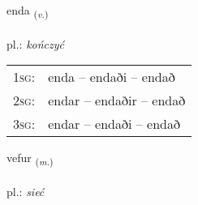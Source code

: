 \documentclass[frontgrid, backgrid]{flacards}\usepackage[]{graphicx}\usepackage[]{xcolor}
\begin{document}
\renewcommand{\flhead}{\vskip5pt \fboxsep=0pt {\small\bfseries\footnotesize Sagnorð | Verb}}
\renewcommand{\fcfoot}{\vskip5pt \fboxsep=0pt \hspace{2pt}{\small\bfseries\footnotesize 1K}}

\renewcommand{\blhead}{\vskip5pt {\small\bfseries\footnotesize Sagnorð | Verb }}
\renewcommand{\bcfoot}{\vskip5pt \hspace{2pt}{\small\bfseries\footnotesize 1K}}


{enda \small{\textsubscript{(\textit{v.})}} \\[1ex] %
\textphonetic{[ɛnta]} \\
pl.: \emph{kończyć} \\  [2ex]
\renewcommand*{\arraystretch}{0.8}
\begin{tabular}{p{1cm}l}
\textsc{1sg}: & enda -- endaði -- endað \\ 
\textsc{2sg}: & endar -- endaðir -- endað \\ 
\textsc{3sg}: & endar -- endaði -- endað \\ 
\end{tabular}
}

\renewcommand{\flhead}{\vskip5pt \fboxsep=0pt {\small\bfseries\footnotesize Nafnorð | Noun}}
\renewcommand{\fcfoot}{\vskip5pt \fboxsep=0pt \hspace{2pt}{\small\bfseries\footnotesize 1K}}

\renewcommand{\blhead}{\vskip5pt {\small\bfseries\footnotesize Nafnorð | Noun }}
\renewcommand{\bcfoot}{\vskip5pt \hspace{2pt}{\small\bfseries\footnotesize 1K}}


{vefur \small{\textsubscript{(\textit{m.})}} \\[1ex] %
\textphonetic{[vɛːvʏr]} \\
pl.: \emph{sieć} \\  [2ex]
\renewcommand*{\arraystretch}{0.8}
}
\end{document}
